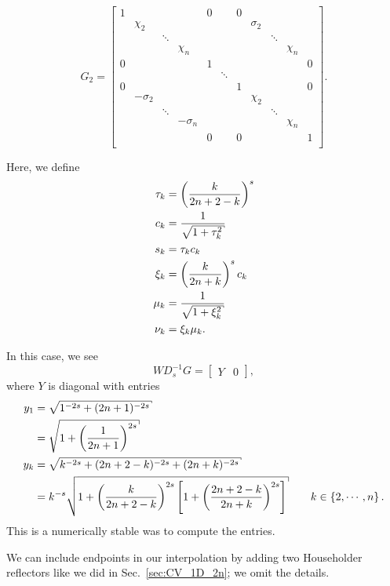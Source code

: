 \begin{equation}
    G_{2} = \begin{bmatrix}
        1 & & & & 0 & & 0 & \\
        & \chi_{2} & & & & & & \sigma_{2} & \\
        & & \ddots & & & & & & \ddots & \\
        & & & \chi_{n} & & & & & & \chi_{n} & \\
        0 & & & & 1 & & & & & & 0 \\
        & & & & & \ddots & \\
        0 & & & & & & 1 & & & & 0 \\
        & -\sigma_{2} & & & & & & \chi_{2} & \\
        & & \ddots & & & & & & \ddots & \\
        & & & -\sigma_{n} & & & & & & \chi_{n} & \\
        & & & & 0 & & 0 & & & & 1 \\
    \end{bmatrix}.
\end{equation}

\noindent
Here, we define
%
\begin{align}
    \tau_{k} &= \parens{\frac{k}{2n+2-k}}^{s} \nonumber\\
    c_{k} &= \frac{1}{\sqrt{1 + \tau_{k}^{2}}} \nonumber\\
    s_{k} &= \tau_{k}c_{k} \nonumber\\
    \xi_{k} &= \parens{\frac{k}{2n+k}}^{s}c_{k} \nonumber\\
    \mu_{k} &= \frac{1}{\sqrt{1 + \xi_{k}^{2}}} \nonumber\\
    \nu_{k} &= \xi_{k}\mu_{k}.
\end{align}

In this case, we see
%
\begin{equation}
    WD_{s}^{-1}G = \begin{bmatrix} Y & 0 \end{bmatrix},
\end{equation}
%
where $Y$ is diagonal with entries
%
\begin{align}
    y_{1} &= \sqrt{1^{-2s} + (2n+1)^{-2s}} \nonumber\\
            &= \sqrt{1 + \parens{\frac{1}{2n+1}}^{2s}} \nonumber\\
    y_{k} &= \sqrt{k^{-2s} + (2n+2-k)^{-2s} + (2n+k)^{-2s}}
                \nonumber\\
            &= k^{-s}\sqrt{1 + \parens{\frac{k}{2n+2-k}}^{2s}\brackets{
                1 + \parens{\frac{2n+2-k}{2n+k}}^{2s}}}
        &\quad k\in\braces{2,\cdots,n}.
\end{align}
%
This is a numerically stable was to compute the entries.

We can include endpoints in our interpolation by adding two Householder
reflectors like we did in Sec.~\ref{sec:CV_1D_2n};
we omit the details.



